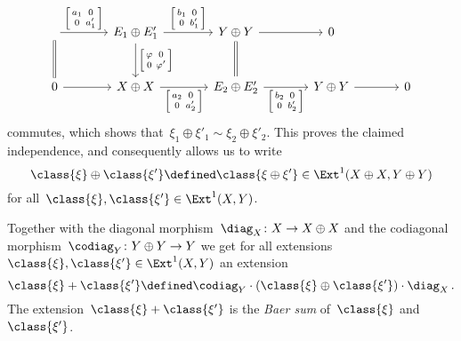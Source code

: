 \begin{remarkdefinition}
\[\begin{tikzcd}[column sep = large, row sep = large, ampersand replacement = \&]
          \arrow{r}[above]{ \begin{bsmallmatrix} a_1 & 0 \\ 0 & a'_1 \end{bsmallmatrix} }
          \arrow[equal]{d}
      \&  E_1 \oplus E'_1
          \arrow{r}[above]{ \begin{bsmallmatrix} b_1 & 0 \\ 0 & b'_1 \end{bsmallmatrix} }
          \arrow{d}[right]{ \begin{bsmallmatrix} \varphi & 0 \\ 0 & \varphi' \end{bsmallmatrix} }
      \&  Y \oplus Y
          \arrow{r}
          \arrow[equal]{d}
      \&  0
      \\
          0
          \arrow{r}
      \&  X \oplus X
          \arrow{r}[below]{ \begin{bsmallmatrix} a_2 & 0 \\ 0 & a'_2 \end{bsmallmatrix} }
      \&  E_2 \oplus E'_2
          \arrow{r}[below]{ \begin{bsmallmatrix} b_2 & 0 \\ 0 & b'_2 \end{bsmallmatrix} }
      \&  Y \oplus Y
          \arrow{r}
      \&  0
    \end{tikzcd}
  \]
  commutes, which shows that~$\xi_1 \oplus \xi'_1 \sim \xi_2 \oplus \xi'_2$.
  This proves the claimed independence, and consequently allows us to write
  \[
    \class{\xi} \oplus \class{\xi'}
    \defined
    \class{\xi \oplus \xi'}
    \in
    \Ext^1(X \oplus X, Y \oplus Y)
  \]
  for all~$\class{\xi}, \class{\xi'} \in \Ext^1(X,Y)$.
  
  Together with the diagonal morphism~$\diag_X \colon X \to X \oplus X$ and the codiagonal morphism~$\codiag_Y \colon Y \oplus Y \to Y$ we get for all extensions~$\class{\xi}, \class{\xi'} \in \Ext^1(X,Y)$ an extension
  \[
    \class{\xi} + \class{\xi'}
    \defined
    \codiag_Y \cdot ( \class{\xi} \oplus \class{\xi'} ) \cdot \diag_X \,.
  \]
  The extension~$\class{\xi} + \class{\xi'}$ is the \emph{Baer sum} of~$\class{\xi}$ and~$\class{\xi'}$.
\end{remarkdefinition}


